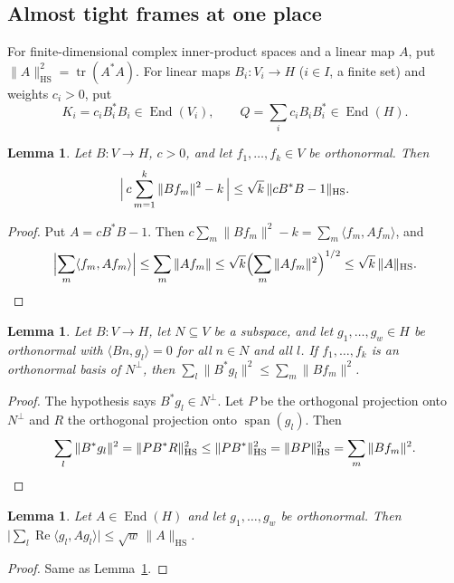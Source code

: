 \documentclass[10pt]{amsart}
\newtheorem{lemma}[theorem]{Lemma}
\theoremstyle{definition}
\theoremstyle{remark}
\newcommand{\Rel}{\operatorname{Re}}
\begin{document}
\subsection{Almost tight frames at one place}

For finite-dimensional complex inner-product spaces and a linear map $A$, put $\|A\|_{\mathrm{HS}}^2=\operatorname{tr}(A^*A)$. For linear maps $B_i\colon V_i\to H$ ($i\in I$, a finite set) and weights $c_i>0$, put
\[
K_i=c_iB_i^*B_i\in\operatorname{End}(V_i),\qquad Q=\sum_ic_iB_iB_i^*\in\operatorname{End}(H).
\]

\begin{lemma}\label{lem:fambound}
Let $B\colon V\to H$, $c>0$, and let $f_1,\dots,f_k\in V$ be orthonormal. Then
\[
\Bigl|\,c\sum_{m=1}^k\|Bf_m\|^2-k\,\Bigr|\le\sqrt k\,\|cB^*B-1\|_{\mathrm{HS}} .
\]
\end{lemma}
\begin{proof}
Put $A=cB^*B-1$. Then $c\sum_m\|Bf_m\|^2-k=\sum_m\langle f_m,Af_m\rangle$, and
\[
\Bigl|\sum_m\langle f_m,Af_m\rangle\Bigr|\le\sum_m\|Af_m\|\le\sqrt k\Bigl(\sum_m\|Af_m\|^2\Bigr)^{1/2}\le\sqrt k\,\|A\|_{\mathrm{HS}} .\qedhere
\]
\end{proof}

\begin{lemma}\label{lem:Wupper}
Let $B\colon V\to H$, let $N\subseteq V$ be a subspace, and let $g_1,\dots,g_w\in H$ be orthonormal with $\langle Bn,g_l\rangle=0$ for all $n\in N$ and all $l$. If $f_1,\dots,f_k$ is an orthonormal basis of $N^\perp$, then $\sum_l\|B^*g_l\|^2\le\sum_m\|Bf_m\|^2$.
\end{lemma}
\begin{proof}
The hypothesis says $B^*g_l\in N^\perp$. Let $P$ be the orthogonal projection onto $N^\perp$ and $R$ the orthogonal projection onto $\operatorname{span}(g_l)$. Then
\[
\sum_l\|B^*g_l\|^2=\|PB^*R\|_{\mathrm{HS}}^2\le\|PB^*\|_{\mathrm{HS}}^2=\|BP\|_{\mathrm{HS}}^2=\sum_m\|Bf_m\|^2 .\qedhere
\]
\end{proof}

\begin{lemma}\label{lem:tracebound}
Let $A\in\operatorname{End}(H)$ and let $g_1,\dots,g_w$ be orthonormal. Then $\bigl|\sum_l\Rel\langle g_l,Ag_l\rangle\bigr|\le\sqrt w\,\|A\|_{\mathrm{HS}}$.
\end{lemma}
\begin{proof}
Same as Lemma~\ref{lem:fambound}.
\end{proof}
\end{document}
